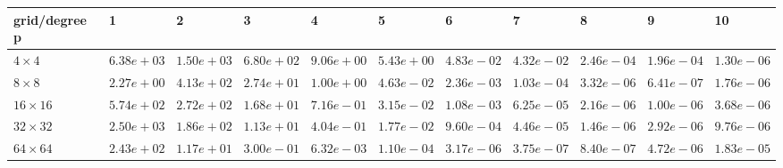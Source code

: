 \begin{tabular}{lllllllllll}
\hline
 grid/degree p   & 1          & 2          & 3          & 4          & 5          & 6          & 7          & 8          & 9          & 10         \\
\hline
 $4 \times 4$    & $6.38e+03$ & $1.50e+03$ & $6.80e+02$ & $9.06e+00$ & $5.43e+00$ & $4.83e-02$ & $4.32e-02$ & $2.46e-04$ & $1.96e-04$ & $1.30e-06$ \\
 $8 \times 8$    & $2.27e+00$ & $4.13e+02$ & $2.74e+01$ & $1.00e+00$ & $4.63e-02$ & $2.36e-03$ & $1.03e-04$ & $3.32e-06$ & $6.41e-07$ & $1.76e-06$ \\
 $16 \times 16$  & $5.74e+02$ & $2.72e+02$ & $1.68e+01$ & $7.16e-01$ & $3.15e-02$ & $1.08e-03$ & $6.25e-05$ & $2.16e-06$ & $1.00e-06$ & $3.68e-06$ \\
 $32 \times 32$  & $2.50e+03$ & $1.86e+02$ & $1.13e+01$ & $4.04e-01$ & $1.77e-02$ & $9.60e-04$ & $4.46e-05$ & $1.46e-06$ & $2.92e-06$ & $9.76e-06$ \\
 $64 \times 64$  & $2.43e+02$ & $1.17e+01$ & $3.00e-01$ & $6.32e-03$ & $1.10e-04$ & $3.17e-06$ & $3.75e-07$ & $8.40e-07$ & $4.72e-06$ & $1.83e-05$ \\
\hline
\end{tabular}
